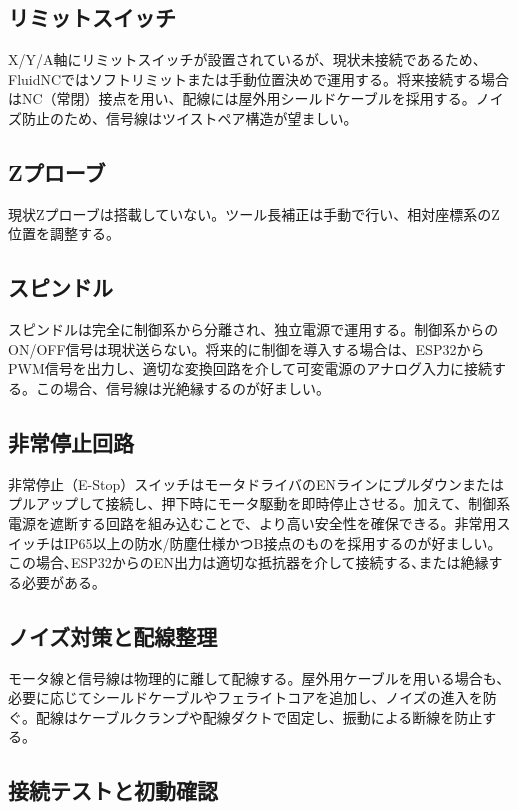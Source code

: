 \documentclass[uplatex,dvipdfmx]{ujarticle}
\begin{document}
\subsection{リミットスイッチ}

X/Y/A軸にリミットスイッチが設置されているが、現状未接続であるため、FluidNCではソフトリミットまたは手動位置決めで運用する。将来接続する場合はNC（常閉）接点を用い、配線には屋外用シールドケーブルを採用する。ノイズ防止のため、信号線はツイストペア構造が望ましい。

\subsection{Zプローブ}

現状Zプローブは搭載していない。ツール長補正は手動で行い、相対座標系のZ位置を調整する。

\subsection{スピンドル}

スピンドルは完全に制御系から分離され、独立電源で運用する。制御系からのON/OFF信号は現状送らない。将来的に制御を導入する場合は、ESP32からPWM信号を出力し、適切な変換回路を介して可変電源のアナログ入力に接続する。この場合、信号線は光絶縁するのが好ましい。

\subsection{非常停止回路}

非常停止（E-Stop）スイッチはモータドライバのENラインにプルダウンまたはプルアップして接続し、押下時にモータ駆動を即時停止させる。加えて、制御系電源を遮断する回路を組み込むことで、より高い安全性を確保できる。非常用スイッチはIP65以上の防水/防塵仕様かつB接点のものを採用するのが好ましい。この場合､ESP32からのEN出力は適切な抵抗器を介して接続する､または絶縁する必要がある｡

\subsection{ノイズ対策と配線整理}

モータ線と信号線は物理的に離して配線する。屋外用ケーブルを用いる場合も、必要に応じてシールドケーブルやフェライトコアを追加し、ノイズの進入を防ぐ。配線はケーブルクランプや配線ダクトで固定し、振動による断線を防止する。

\subsection{接続テストと初動確認}
\end{document}
